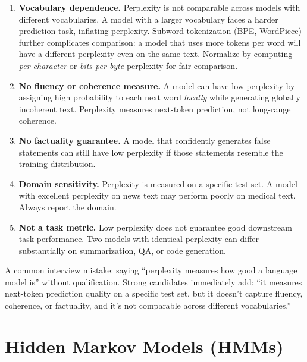 \begin{enumerate}
    \item \textbf{Vocabulary dependence.}  Perplexity is not comparable across
    models with different vocabularies.  A model with a larger vocabulary faces
    a harder prediction task, inflating perplexity.  Subword tokenization
    (BPE, WordPiece) further complicates comparison: a model that uses more
    tokens per word will have a different perplexity even on the same text.
    Normalize by computing \emph{per-character} or \emph{bits-per-byte}
    perplexity for fair comparison.

    \item \textbf{No fluency or coherence measure.}  A model can have low
    perplexity by assigning high probability to each next word \emph{locally}
    while generating globally incoherent text.  Perplexity measures
    next-token prediction, not long-range coherence.

    \item \textbf{No factuality guarantee.}  A model that confidently generates
    false statements can still have low perplexity if those statements
    resemble the training distribution.

    \item \textbf{Domain sensitivity.}  Perplexity is measured on a specific
    test set.  A model with excellent perplexity on news text may perform
    poorly on medical text.  Always report the domain.

    \item \textbf{Not a task metric.}  Low perplexity does not guarantee good
    downstream task performance.  Two models with identical perplexity can
    differ substantially on summarization, QA, or code generation.
\end{enumerate}

\begin{warningbox}
A common interview mistake: saying ``perplexity measures how good a language
model is'' without qualification.  Strong candidates immediately add: ``it
measures next-token prediction quality on a specific test set, but it
doesn't capture fluency, coherence, or factuality, and it's not comparable
across different vocabularies.''
\end{warningbox}


\section{Hidden Markov Models (HMMs)}
\label{sec:hmm}

